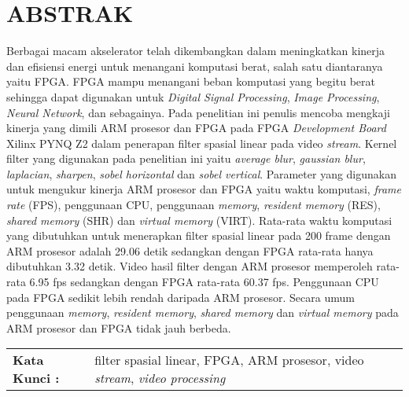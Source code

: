 \chapter*{ABSTRAK}


Berbagai macam akselerator telah dikembangkan dalam meningkatkan kinerja dan efisiensi energi untuk menangani komputasi berat, salah satu diantaranya yaitu FPGA. FPGA mampu menangani beban komputasi yang begitu berat sehingga dapat digunakan untuk \textit{Digital Signal Processing}, \textit{Image Processing}, \textit{Neural Network}, dan sebagainya.
Pada penelitian ini penulis mencoba mengkaji kinerja yang dimili ARM prosesor dan FPGA pada FPGA \textit{Development Board} Xilinx PYNQ Z2 dalam penerapan filter spasial linear pada video \textit{stream}. Kernel filter yang digunakan pada penelitian ini yaitu \textit{average blur}, \textit{gaussian blur}, \textit{laplacian}, \textit{sharpen}, \textit{sobel horizontal} dan \textit{sobel vertical}. Parameter yang digunakan untuk mengukur kinerja ARM prosesor dan FPGA yaitu waktu komputasi, \textit{frame rate} (FPS), penggunaan CPU, penggunaan \textit{memory}, \textit{resident memory} (RES), \textit{shared memory} (SHR) dan \textit{virtual memory} (VIRT).
Rata-rata waktu komputasi yang dibutuhkan untuk menerapkan filter spasial linear pada 200 frame dengan ARM prosesor adalah 29.06 detik sedangkan dengan FPGA rata-rata hanya dibutuhkan 3.32 detik. Video hasil filter dengan ARM prosesor memperoleh rata-rata 6.95 fps sedangkan dengan FPGA rata-rata 60.37 fps. Penggunaan CPU pada FPGA sedikit lebih rendah daripada ARM prosesor. Secara umum penggunaan \textit{memory}, \textit{resident memory}, \textit{shared memory} dan \textit{virtual memory} pada ARM prosesor dan FPGA tidak jauh berbeda.


\begin{table}[h]
    \begin{tabular}{ p{} p{} }
        \\
        \textbf{Kata Kunci :} & filter spasial linear, FPGA, ARM prosesor, video \textit{stream}, \textit{video processing}
    \end{tabular}
\end{table}

 